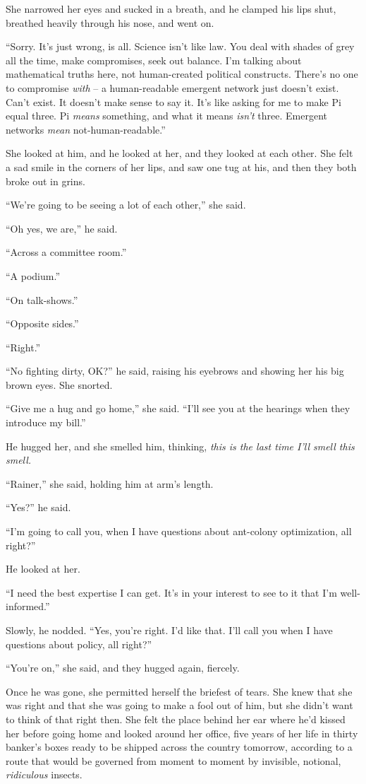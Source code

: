 She narrowed her eyes and sucked in a breath, and he clamped his lips 
shut, breathed heavily through his nose, and went on.

“Sorry. It's just wrong, is all. Science isn't like law. You deal 
with shades of grey all the time, make compromises, seek out balance. 
I'm talking about mathematical truths here, not human-created political 
constructs. There's no one to compromise \emph{with} -- a 
human-readable emergent network just doesn't exist. Can't exist. It 
doesn't make sense to say it. It's like asking for me to make Pi equal 
three. Pi \emph{means} something, and what it means \emph{isn't} three. 
Emergent networks \emph{mean} not-human-readable.”

She looked at him, and he looked at her, and they looked at each other. 
She felt a sad smile in the corners of her lips, and saw one tug at 
his, and then they both broke out in grins.

“We're going to be seeing a lot of each other,” she said.

“Oh yes, we are,” he said.

“Across a committee room.”

“A podium.”

“On talk-shows.”

“Opposite sides.”

“Right.”

“No fighting dirty, OK?” he said, raising his eyebrows and showing 
her his big brown eyes. She snorted.

“Give me a hug and go home,” she said. “I'll see you at the 
hearings when they introduce my bill.”

He hugged her, and she smelled him, thinking, \emph{this is the last 
time I'll smell this smell.}

“Rainer,” she said, holding him at arm's length.

“Yes?” he said.

“I'm going to call you, when I have questions about ant-colony 
optimization, all right?”

He looked at her.

“I need the best expertise I can get. It's in your interest to see to 
it that I'm well-informed.”

Slowly, he nodded. “Yes, you're right. I'd like that. I'll call you 
when I have questions about policy, all right?”

“You're on,” she said, and they hugged again, fiercely.

Once he was gone, she permitted herself the briefest of tears. She knew 
that she was right and that she was going to make a fool out of him, 
but she didn't want to think of that right then. She felt the place 
behind her ear where he'd kissed her before going home and looked 
around her office, five years of her life in thirty banker's boxes 
ready to be shipped across the country tomorrow, according to a route 
that would be governed from moment to moment by invisible, notional, 
\emph{ridiculous} insects.

